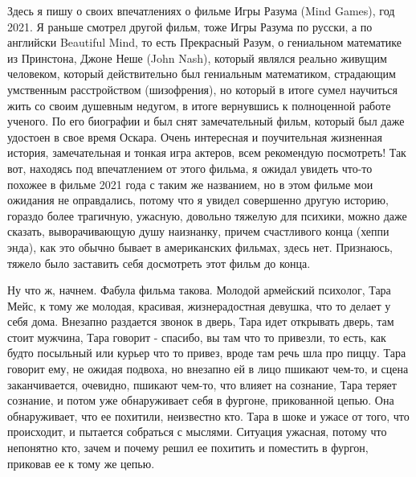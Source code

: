  
 
 
 
 

Здесь я пишу о своих впечатлениях о фильме Игры Разума (Mind Games), год 2021.
Я раньше смотрел другой фильм, тоже Игры Разума по русски, а по английски
Beautiful Mind, то есть Прекрасный Разум, о гениальном математике из Принстона,
Джоне Неше (John Nash), который являлся реально живущим человеком, который
действительно был гениальным математиком, страдающим умственным расстройством
(шизофрения), но который в итоге сумел научиться жить со своим душевным
недугом, в итоге вернувшись к полноценной работе ученого. По его биографии и
был снят замечательный фильм, который был даже удостоен в свое время Оскара.
Очень интересная и поучительная жизненная история, замечательная и тонкая игра
актеров, всем рекомендую посмотреть! Так вот, находясь под впечатлением от
этого фильма, я ожидал увидеть что-то похожее в фильме 2021 года с таким же
названием, но в этом фильме мои ожидания не оправдались, потому что я увидел
совершенно другую историю, гораздо более трагичную, ужасную, довольно тяжелую
для психики, можно даже сказать, выворачивающую душу наизнанку, причем
счастливого конца (хеппи энда), как это обычно бывает в американских фильмах,
здесь нет. Признаюсь, тяжело было заставить себя досмотреть этот фильм до
конца.

Ну что ж, начнем. Фабула фильма такова. Молодой армейский психолог, Тара Мейс,
к тому же молодая, красивая, жизнерадостная девушка, что то делает у себя дома.
Внезапно раздается звонок в дверь, Тара идет открывать дверь, там стоит
мужчина, Тара говорит - спасибо, вы там что то привезли, то есть, как будто
посыльный или курьер что то привез, вроде там речь шла про пиццу. Тара говорит
ему, не ожидая подвоха, но внезапно ей в лицо пшикают чем-то, и сцена
заканчивается, очевидно, пшикают чем-то, что влияет на сознание, Тара теряет
сознание, и потом уже обнаруживает себя в фургоне, прикованной цепью. Она
обнаруживает, что ее похитили, неизвестно кто. Тара в шоке и ужасе от того, что
происходит, и пытается собраться с мыслями. Ситуация ужасная, потому что
непонятно кто, зачем и почему решил ее похитить и поместить в фургон, приковав
ее к тому же цепью.

